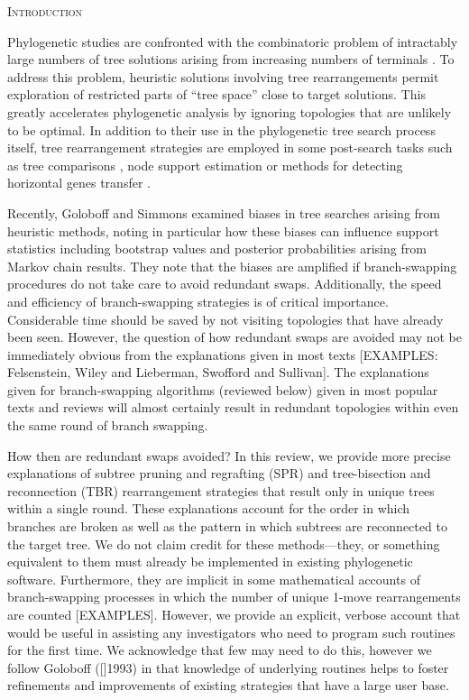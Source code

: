 \documentclass[12pt,letterpaper]{article}
\renewcommand{\section}[1]{%
\bigskip
\begin{center}
\begin{Large}
\normalfont\scshape #1
\medskip
\end{Large}
\end{center}}
\begin{document}
\section{Introduction}

Phylogenetic studies are confronted with the combinatoric problem of intractably large numbers of tree solutions arising from increasing numbers of terminals \citep[]{Felsenstein:1978vh}.
To address this problem, heuristic solutions involving tree rearrangements permit exploration of restricted parts of ``tree space'' close to target solutions.
This greatly accelerates phylogenetic analysis by ignoring topologies that are unlikely to be optimal.
In addition to their use in the phylogenetic tree search process itself, tree rearrangement strategies are employed in some post-search tasks such as tree comparisons \citep[e.g.][]{allen2001subtree,kuhner2015treComparison}, node support estimation \citep[e.g.][]{goloboff2014bias} or methods for detecting horizontal genes transfer \citep[e.g.][]{mcfadden1995something,bordewich2005computational}.

Recently, Goloboff and Simmons \citep[(2014)]{goloboff2014bias} examined biases in tree searches arising from heuristic methods, noting in particular how these biases can influence support statistics including bootstrap values and posterior probabilities arising from Markov chain results.
They note that the biases are amplified if branch-swapping procedures do not take care to avoid redundant swaps.
Additionally, the speed and efficiency of branch-swapping strategies is of critical importance.
Considerable time should be saved by not visiting topologies that have already been seen.
However, the question of how redundant swaps are avoided may not be immediately obvious from the explanations given in most texts [EXAMPLES: Felsenstein, Wiley and Lieberman, Swofford and Sullivan].
The explanations given for branch-swapping algorithms (reviewed below) given in most popular texts and reviews will almost certainly result in redundant topologies within even the same round of branch swapping.

How then are redundant swaps avoided?
In this review, we provide more precise explanations of subtree pruning and regrafting (SPR) and tree-bisection and reconnection (TBR) rearrangement strategies that result only in unique trees within a single round. 
These explanations account for the order in which branches are broken as well as the pattern in which subtrees are reconnected to the target tree.
We do not claim credit for these methods---they, or something equivalent to them must already be implemented in existing phylogenetic software.
Furthermore, they are implicit in some mathematical accounts of branch-swapping processes in which the number of unique 1-move rearrangements are counted [EXAMPLES].
However, we provide an explicit, verbose account that would be useful in assisting any investigators who need to program such routines for the first time. 
We acknowledge that few may need to do this, however we follow Goloboff ([]1993) in that knowledge of underlying routines helps to foster refinements and improvements of existing strategies that have a large user base.
\end{document}
